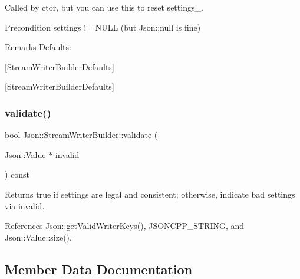 Called by ctor, but you can use this to reset settings\+\_\+. \begin{DoxyPrecond}{Precondition}
\textquotesingle{}settings\textquotesingle{} != N\+U\+LL (but Json\+::null is fine) 
\end{DoxyPrecond}
\begin{DoxyRemark}{Remarks}
Defaults\+: 
\begin{DoxyCodeInclude}
\end{DoxyCodeInclude}

\end{DoxyRemark}
\mbox{[}Stream\+Writer\+Builder\+Defaults\mbox{]}

\mbox{[}Stream\+Writer\+Builder\+Defaults\mbox{]} \mbox{\label{classJson_1_1StreamWriterBuilder_a12353b97766841db7d049da84658da09_a12353b97766841db7d049da84658da09}} 
\subsubsection{\texorpdfstring{validate()}{validate()}}
{\footnotesize\ttfamily bool Json\+::\+Stream\+Writer\+Builder\+::validate (\begin{DoxyParamCaption}\item[{\hyperlink{classJson_1_1Value}{Json\+::\+Value} $\ast$}]{invalid }\end{DoxyParamCaption}) const}

\begin{DoxyReturn}{Returns}
true if \textquotesingle{}settings\textquotesingle{} are legal and consistent; otherwise, indicate bad settings via \textquotesingle{}invalid\textquotesingle{}. 
\end{DoxyReturn}


References Json\+::get\+Valid\+Writer\+Keys(), J\+S\+O\+N\+C\+P\+P\+\_\+\+S\+T\+R\+I\+NG, and Json\+::\+Value\+::size().



\subsection{Member Data Documentation}
\mbox{\label{classJson_1_1StreamWriterBuilder_a79bdf2e639a52f4e758c0b95bd1d3423_a79bdf2e639a52f4e758c0b95bd1d3423}} 
